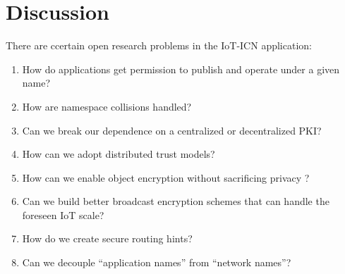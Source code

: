 \section{Discussion}
\label{sec:discussion}
There are ccertain open research problems in the IoT-ICN application:
\begin{enumerate}
\item How do applications get permission to publish and operate under a given name?
\item How are namespace collisions handled?
\item Can we break our dependence on a centralized or decentralized PKI?
\item How can we adopt distributed trust models?
\item How can we enable object encryption without sacrificing privacy ?
\item Can we build better broadcast encryption schemes that can handle the foreseen IoT scale?
\item How do we create secure routing hints?
\item Can we decouple “application names” from “network names”?
\end{enumerate}